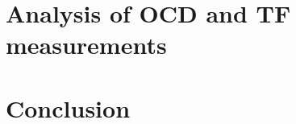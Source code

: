 \documentclass[pra,superscriptaddress,reprint]{revtex4-1}
\begin{document}
\section{Analysis of OCD and TF measurements}


\section{Conclusion}



\appendix

\end{document}
